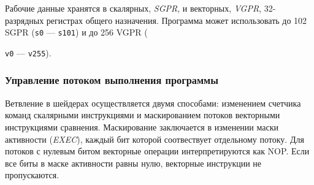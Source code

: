 \documentclass[a4paper,14pt]{extarticle}
\begin{document}
Рабочие данные хранятся в скалярных, \textit{SGPR}, и векторных, \textit{VGPR},
32-разрядных регистрах общего назначения. Программа может использовать до 102
SGPR (\verb|s0| — \verb|s101|) и до 256 VGPR ({\verb|v0| — \verb|v255|).

\subsubsection{Управление потоком выполнения программы}
\label{section:gcn-program-flow}

Ветвление в шейдерах осуществляется двумя способами: изменением счетчика команд скалярными
инструкциями и маскированием потоков векторными инструкциями сравнения\cite{vega-isa}.
Маскирование заключается в изменении маски активности (\textit{EXEC}), каждый бит которой
соотвествует отдельному потоку. Для потоков с нулевым битом векторные операции интерпретируются как NOP.
Если все биты в маске активности равны нулю, векторные инструкции не пропускаются.

}
\end{document}

